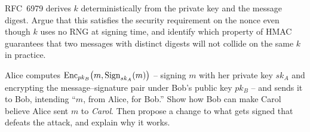 \begin{exercise}
RFC~6979 derives $k$ deterministically from the private key and the message digest. Argue that this satisfies the security requirement on the nonce even though $k$ uses no RNG at signing time, and identify which property of HMAC guarantees that two messages with distinct digests will not collide on the same $k$ in practice.
\end{exercise}

\begin{exercise}
Alice computes $\operatorname{Enc}_{pk_B}\bigl(m, \operatorname{Sign}_{sk_A}(m)\bigr)$ -- signing $m$ with her private key $sk_A$ and encrypting the message--signature pair under Bob's public key $pk_B$ -- and sends it to Bob, intending ``$m$, from Alice, for Bob.'' Show how Bob can make Carol believe Alice sent $m$ to \emph{Carol}. Then propose a change to what gets signed that defeats the attack, and explain why it works.
\end{exercise}
